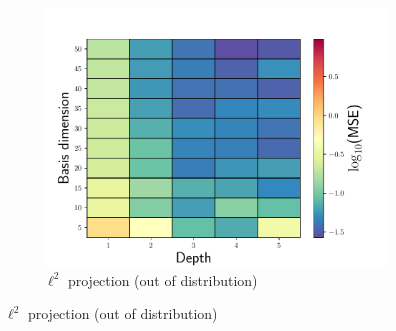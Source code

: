 \documentclass[3p,computermodern,10pt]{elsarticle}
\begin{document}
\begin{figure}
\begin{center}
\begin{subfigure}[t]{0.32\textwidth}
\includegraphics[trim={0cm 0cm 0cm 0cm},clip,width=1.0\linewidth]{code/burgers/synapse_models/basis_study/MSE_testing.pdf}
\caption{$\ell^2$ projection (out of distribution)}
\end{subfigure}


\end{center}
\end{figure}
\end{document}
